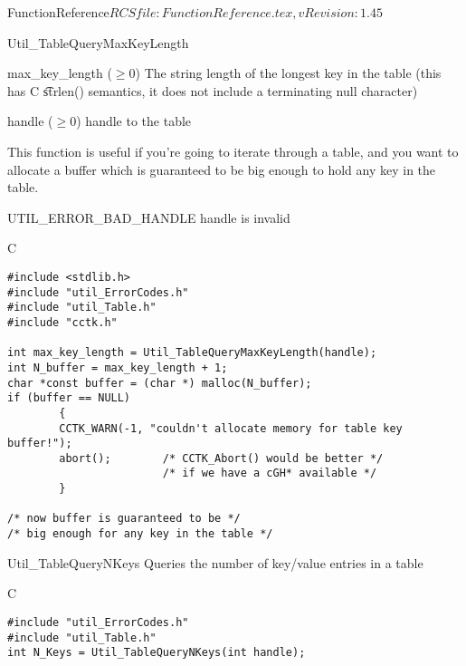 \begin{cactuspart}{5}{FunctionReference}{$RCSfile: FunctionReference.tex,v $}{$Revision: 1.45 $}
\begin{FunctionDescription}{Util\_TableQueryMaxKeyLength}
\begin{Result}{max\_key\_length ($\ge 0$)}
\quad\quad\quad
The string length of the longest key in the table
(this has C {\t strlen()} semantics, \ie{} it does not
include a terminating null character)
\end{Result}

\begin{Parameter}{handle ($\ge 0$)}
handle to the table
\end{Parameter}

\begin{Discussion}
This function is useful if you're going to iterate through a table,
and you want to allocate a buffer which is guaranteed to be big enough
to hold any key in the table.
\end{Discussion}

\begin{Error}{UTIL\_ERROR\_BAD\_HANDLE}
handle is invalid
\end{Error}

\begin{Example}{C}
\begin{verbatim}
#include <stdlib.h>
#include "util_ErrorCodes.h"
#include "util_Table.h"
#include "cctk.h"

int max_key_length = Util_TableQueryMaxKeyLength(handle);
int N_buffer = max_key_length + 1;
char *const buffer = (char *) malloc(N_buffer);
if (buffer == NULL)
        {
        CCTK_WARN(-1, "couldn't allocate memory for table key buffer!");
        abort();        /* CCTK_Abort() would be better */
                        /* if we have a cGH* available */
        }

/* now buffer is guaranteed to be */
/* big enough for any key in the table */
\end{verbatim}
\end{Example}
\end{FunctionDescription}


\begin{FunctionDescription}{Util\_TableQueryNKeys}
\label{Util-TableQueryNKeys}
Queries the number of key/value entries in a table

\begin{Synopsis}{C}
\begin{verbatim}
#include "util_ErrorCodes.h"
#include "util_Table.h"
int N_Keys = Util_TableQueryNKeys(int handle);
\end{verbatim}
\end{Synopsis}


\end{FunctionDescription}
\end{cactuspart}
